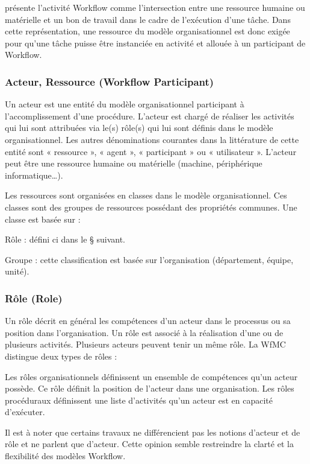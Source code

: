  	 \parencite{VanderAalst} présente l’activité Workflow comme l’intersection entre une ressource humaine ou matérielle et un bon de travail dans le cadre de l’exécution d’une tâche. Dans cette représentation, une ressource du modèle organisationnel est donc exigée pour qu’une tâche puisse être instanciée en activité et allouée à un participant de Workflow. 
 	 
 	 
 	 
 	  	 \subsubsection{ Acteur, Ressource (Workflow Participant) }
 	 
 	Un acteur est une entité du modèle organisationnel participant à l’accomplissement d’une procédure. L’acteur est chargé de réaliser les activités qui lui sont attribuées via le(s) rôle(s) qui lui sont définis dans le modèle organisationnel. Les autres dénominations courantes dans la littérature de cette entité sont « ressource », « agent », « participant » ou « utilisateur ». L’acteur peut être une ressource humaine ou matérielle (machine, périphérique informatique…).
 	 
 	 Les ressources sont organisées en classes dans le modèle organisationnel. Ces classes sont des groupes de ressources possédant des propriétés communes. Une classe est basée sur :
 	 
 	  Rôle : défini ci dans le § suivant. 
 	  
 	 Groupe : cette classification est basée sur l’organisation (département, équipe, unité). 
 	 
 	 \subsubsection{ Rôle (Role) }
 	 
 	 
 	 Un rôle décrit en général les compétences d’un acteur dans le processus ou sa position dans l’organisation. Un rôle est associé à la réalisation d’une ou de plusieurs activités. Plusieurs acteurs peuvent tenir un même rôle. La WfMC distingue deux types de rôles \parencite{WFMC11} :
 	 
 	 Les rôles organisationnels définissent un ensemble de compétences qu’un acteur possède. Ce rôle définit la position de l’acteur dans une organisation. Les rôles procéduraux définissent une liste d’activités qu’un acteur est en capacité d’exécuter. 
 	 
 	 Il est à noter que certains travaux ne différencient pas les notions d’acteur et de rôle et ne parlent que d’acteur. Cette opinion semble restreindre la clarté et la flexibilité des modèles Workflow. 
 	 

